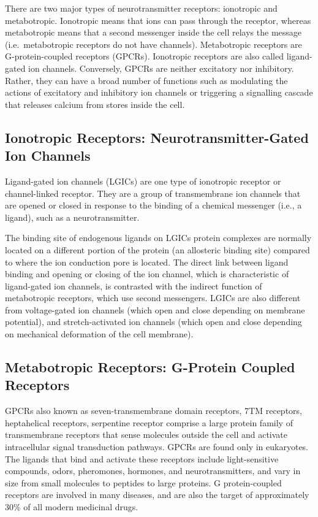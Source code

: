 There are two major types of neurotransmitter receptors: ionotropic and metabotropic. Ionotropic means that ions can pass through the receptor, whereas metabotropic means that a second messenger inside the cell relays the message (i.e.~metabotropic receptors do not have channels). Metabotropic receptors are G-protein-coupled receptors (GPCRs). Ionotropic receptors are also called ligand-gated ion channels. Conversely, GPCRs are neither excitatory nor inhibitory. Rather, they can have a broad number of functions such as modulating the actions of excitatory and inhibitory ion channels or triggering a signalling cascade that releases calcium from stores inside the cell.

\hypertarget{ionotropic-receptors-neurotransmitter-gated-ion-channels}{%
\subsection{Ionotropic Receptors: Neurotransmitter-Gated Ion Channels}\label{ionotropic-receptors-neurotransmitter-gated-ion-channels}}

Ligand-gated ion channels (LGICs) are one type of ionotropic receptor or channel-linked receptor. They are a group of transmembrane ion channels that are opened or closed in response to the binding of a chemical messenger (i.e., a ligand), such as a neurotransmitter.

The binding site of endogenous ligands on LGICs protein complexes are normally located on a different portion of the protein (an allosteric binding site) compared to where the ion conduction pore is located. The direct link between ligand binding and opening or closing of the ion channel, which is characteristic of ligand-gated ion channels, is contrasted with the indirect function of metabotropic receptors, which use second messengers. LGICs are also different from voltage-gated ion channels (which open and close depending on membrane potential), and stretch-activated ion channels (which open and close depending on mechanical deformation of the cell membrane).

\hypertarget{metabotropic-receptors-g-protein-coupled-receptors}{%
\subsection{Metabotropic Receptors: G-Protein Coupled Receptors}\label{metabotropic-receptors-g-protein-coupled-receptors}}

GPCRs also known as seven-transmembrane domain receptors, 7TM receptors, heptahelical receptors, serpentine receptor comprise a large protein family of transmembrane receptors that sense molecules outside the cell and activate intracellular signal transduction pathways. GPCRs are found only in eukaryotes. The ligands that bind and activate these receptors include light-sensitive compounds, odors, pheromones, hormones, and neurotransmitters, and vary in size from small molecules to peptides to large proteins. G protein-coupled receptors are involved in many diseases, and are also the target of approximately 30\% of all modern medicinal drugs.

